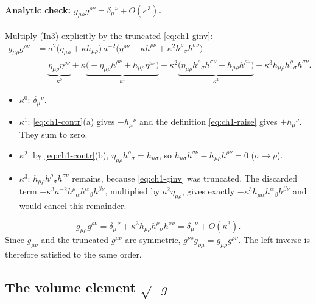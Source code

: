 \paragraph{Analytic check: $g_{\mu\rho}g^{\rho\nu}=\delta_\mu{}^\nu+O(\kappa^3)$.}
Multiply (In3) explicitly by the truncated \eqref{eq:ch1-ginv}:
\begin{equation}
\begin{aligned}
g_{\mu\rho}g^{\rho\nu}
&=a^2\big(\eta_{\mu\rho}+\kappa h_{\mu\rho}\big)\,a^{-2}\big(\eta^{\rho\nu}-\kappa h^{\rho\nu}+\kappa^2h^\rho{}_\sigma h^{\sigma\nu}\big)\\
&=\underbrace{\eta_{\mu\rho}\eta^{\rho\nu}}_{\kappa^0}
+\kappa\underbrace{\big(-\eta_{\mu\rho}h^{\rho\nu}+h_{\mu\rho}\eta^{\rho\nu}\big)}_{\kappa^1}
+\kappa^2\underbrace{\big(\eta_{\mu\rho}h^\rho{}_\sigma h^{\sigma\nu}-h_{\mu\rho}h^{\rho\nu}\big)}_{\kappa^2}
+\kappa^3h_{\mu\rho}h^\rho{}_\sigma h^{\sigma\nu}.
\end{aligned}
\label{eq:ch1-ggcheck}
\end{equation}
\begin{itemize}[leftmargin=1.4em]
\item $\kappa^0$: $\delta_\mu{}^\nu$.
\item $\kappa^1$: \eqref{eq:ch1-contr}(a) gives $-h_\mu{}^\nu$ and the definition
\eqref{eq:ch1-raise} gives $+h_\mu{}^\nu$. They sum to zero.
\item $\kappa^2$: by \eqref{eq:ch1-contr}(b), $\eta_{\mu\rho}h^\rho{}_\sigma=h_{\mu\sigma}$,
so $h_{\mu\sigma}h^{\sigma\nu}-h_{\mu\rho}h^{\rho\nu}=0$ ($\sigma\to\rho$).
\item $\kappa^3$: $h_{\mu\rho}h^\rho{}_\sigma h^{\sigma\nu}$ remains, because
\eqref{eq:ch1-ginv} was truncated. The discarded term
$-\kappa^3a^{-2}h^\rho{}_\alpha h^\alpha{}_\beta h^{\beta\nu}$, multiplied by
$a^2\eta_{\mu\rho}$, gives exactly $-\kappa^3h_{\mu\alpha}h^\alpha{}_\beta h^{\beta\nu}$
and would cancel this remainder.
\end{itemize}
\begin{equation}
g_{\mu\rho}g^{\rho\nu}=\delta_\mu{}^\nu+\kappa^3h_{\mu\rho}h^\rho{}_\sigma h^{\sigma\nu}=\delta_\mu{}^\nu+O(\kappa^3).
\label{eq:ch1-ggres}
\end{equation}
Since $g_{\mu\nu}$ and the truncated $g^{\mu\nu}$ are symmetric,
$g^{\nu\rho}g_{\rho\mu}=g_{\mu\rho}g^{\rho\nu}$. The left inverse is therefore
satisfied to the same order.

\subsection{The volume element \texorpdfstring{$\sqrt{-g}$}{sqrt(-g)}}
\label{sec:ch1-t1-volume}

